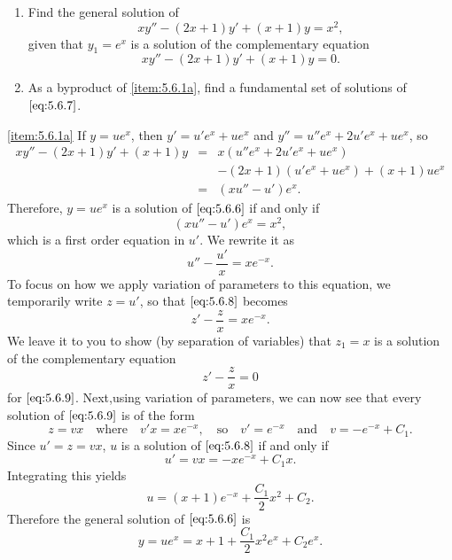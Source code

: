 \documentclass{ximera}
\begin{document}
\begin{example}\label{example:5.6.1}
\begin{enumerate}
\item \label{item:5.6.1a} %
 Find the general solution of
\begin{equation} \label{eq:5.6.6}
xy''-(2x+1)y'+(x+1)y=x^2,
\end{equation}
given that $y_1=e^x$ is a solution of the complementary equation
\begin{equation} \label{eq:5.6.7}
xy''-(2x+1)y'+(x+1)y=0.
\end{equation}
\item \label{item:5.6.1b}%
As a byproduct of \ref{item:5.6.1a}, find a fundamental set of solutions of
$\eqref{eq:5.6.7}$.
\end{enumerate}
 
\begin{explanation} \ref{item:5.6.1a}
If
$y=ue^x$, then $y'=u'e^x+ue^x$ and
$y''=u''e^x+2u'e^x+ue^x$, so
\begin{eqnarray*}
xy''-(2x+1)y'+(x+1)y&=&x(u''e^x+2u'e^x+ue^x)\\
&&-(2x+1)(u'e^x+ue^x)+(x+1)ue^x\\
&=&(xu''-u')e^x.
\end{eqnarray*}
Therefore, $y=ue^x$ is a solution of $\eqref{eq:5.6.6}$ if and only if
$$
(xu''-u')e^x=x^2,
$$
which is a first order equation in $u'$. We rewrite it as
\begin{equation} \label{eq:5.6.8}
u''-\frac{u'}{x}=xe^{-x}.
\end{equation}
To focus on how we apply variation of parameters to this equation, we
temporarily write $z=u'$, so that $\eqref{eq:5.6.8}$ becomes
\begin{equation} \label{eq:5.6.9}
z'-\frac{z}{x}=xe^{-x}.
\end{equation}
We leave it to you to show (by separation of variables) that $z_1=x$
is a solution of the complementary equation
$$
z'-\frac{z}{x}=0
$$
for $\eqref{eq:5.6.9}$. Next,using variation of parameters, we can now see that every solution of
$\eqref{eq:5.6.9}$ is of the form
$$
z=vx\quad\mbox{where}\quad
v'x=xe^{-x}, \quad\mbox{so}\quad v'=e^{-x} \quad\mbox{and}\quad
v=-e^{-x}+C_1.
$$
Since $u'=z=vx$,   $u$ is a solution of $\eqref{eq:5.6.8}$ if and only if
$$
u'=vx=-xe^{-x}+C_1x.
$$
Integrating this yields
$$
u=(x+1)e^{-x}+\frac{C_1}{2}x^2+C_2.
$$
Therefore the general solution of $\eqref{eq:5.6.6}$ is
\begin{equation} \label{eq:5.6.10}
y=ue^x=x+1+\frac{C_1}{2}x^2e^x+C_2e^x.
\end{equation}
 

\end{explanation}
\end{example}
\end{document}
